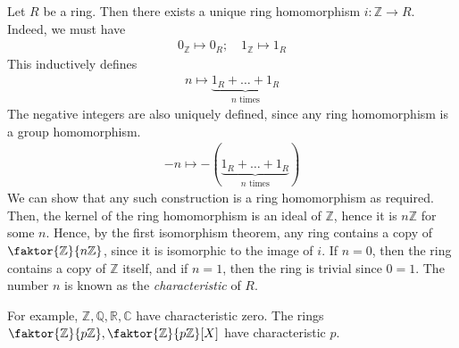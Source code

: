 \begin{example}
	Let $R$ be a ring.
	Then there exists a unique ring homomorphism $i \colon \mathbb Z \to R$.
	Indeed, we must have
	\begin{align*}
		0_{\mathbb Z} \mapsto 0_R;\quad 1_{\mathbb Z} \mapsto 1_R
	\end{align*}
	This inductively defines
	\begin{align*}
		n \mapsto \underbrace{1_R + \dots + 1_R}_{n \text{ times}}
	\end{align*}
	The negative integers are also uniquely defined, since any ring homomorphism is a group homomorphism.
	\begin{align*}
		-n \mapsto -(\underbrace{1_R + \dots + 1_R}_{n \text{ times}})
	\end{align*}
	We can show that any such construction is a ring homomorphism as required.
	Then, the kernel of the ring homomorphism is an ideal of $\mathbb Z$, hence it is $n\mathbb Z$ for some $n$.
	Hence, by the first isomorphism theorem, any ring contains a copy of $\faktor{\mathbb Z}{n\mathbb Z}$, since it is isomorphic to the image of $i$.
	If $n = 0$, then the ring contains a copy of $\mathbb Z$ itself, and if $n = 1$, then the ring is trivial since $0 = 1$.
	The number $n$ is known as the \textit{characteristic} of $R$.

	For example, $\mathbb Z, \mathbb Q, \mathbb R, \mathbb C$ have characteristic zero.
	The rings $\faktor{\mathbb Z}{p \mathbb Z}, \faktor{\mathbb Z}{p \mathbb Z}[X]$ have characteristic $p$.
\end{example}

